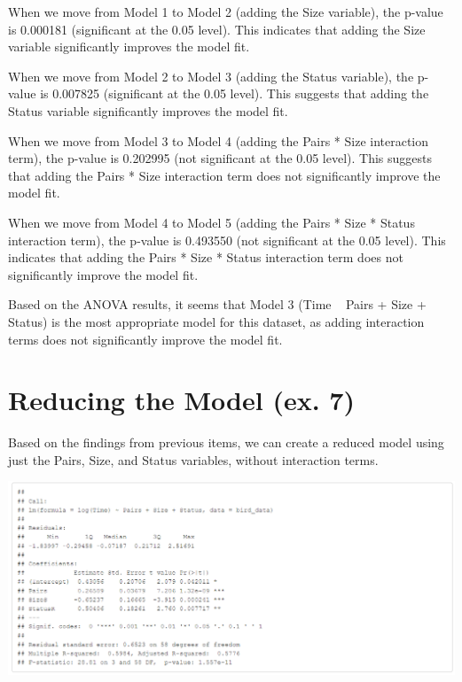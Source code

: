 \documentclass{article}
\begin{document}
When we move from Model 1 to Model 2 (adding the Size variable), the p-value is 0.000181 (significant at the 0.05 level). This indicates that adding the Size variable significantly improves the model fit.

When we move from Model 2 to Model 3 (adding the Status variable), the p-value is 0.007825 (significant at the 0.05 level). This suggests that adding the Status variable significantly improves the model fit.

When we move from Model 3 to Model 4 (adding the Pairs * Size interaction term), the p-value is 0.202995 (not significant at the 0.05 level). This suggests that adding the Pairs * Size interaction term does not significantly improve the model fit.

When we move from Model 4 to Model 5 (adding the Pairs * Size * Status interaction term), the p-value is 0.493550 (not significant at the 0.05 level). This indicates that adding the Pairs * Size * Status interaction term does not significantly improve the model fit.

Based on the ANOVA results, it seems that Model 3 (Time ~ Pairs + Size + Status) is the most appropriate model for this dataset, as adding interaction terms does not significantly improve the model fit.

\section{Reducing the Model (ex. 7)}
Based on the findings from previous items, we can create a reduced model using just the Pairs, Size, and Status variables, without interaction terms.


\includegraphics[scale=0.5]{tables/all-added.png}
\end{document}

